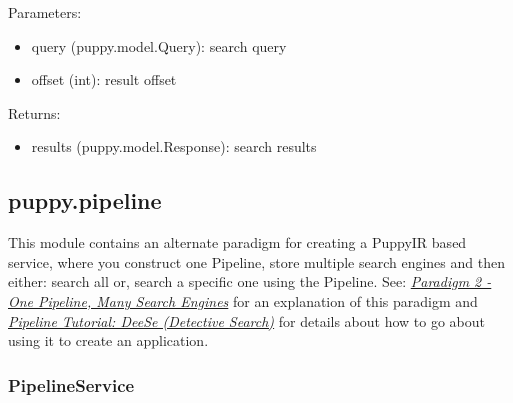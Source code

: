 \documentclass[letterpaper,10pt,english]{sphinxmanual}
\begin{document}
\begin{fulllineitems}
\begin{fulllineitems}
Parameters:
\begin{itemize}
\item {} 
query (puppy.model.Query): search query

\item {} 
offset (int): result offset

\end{itemize}

Returns:
\begin{itemize}
\item {} 
results (puppy.model.Response): search results

\end{itemize}

\end{fulllineitems}


\end{fulllineitems}



\subsection{puppy.pipeline}
\label{api2.0:module-puppy.pipeline}\label{api2.0:puppy-pipeline}
This module contains an alternate paradigm for creating a PuppyIR based service, where you construct one Pipeline, store multiple search engines and then either: search all or, search a specific one using the Pipeline. See: {\hyperref[pipeline:pipeline-architecture]{\emph{Paradigm 2 - One Pipeline, Many Search Engines}}} for an explanation of this paradigm and {\hyperref[pipeline-tutorial:pipeline-puppyir-tutorial]{\emph{Pipeline Tutorial: DeeSe (Detective Search)}}} for details about how to go about using it to create an application.


\subsubsection{PipelineService}
\label{api2.0:pipelineservice}
\end{document}
